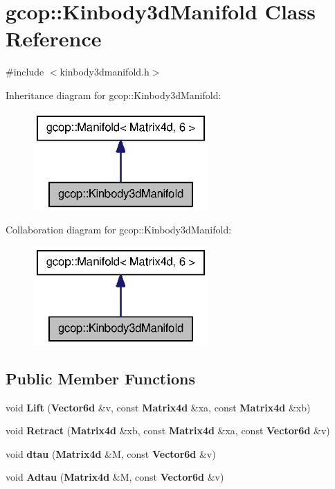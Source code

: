 \section{gcop\-:\-:\-Kinbody3d\-Manifold \-Class \-Reference}
\label{classgcop_1_1Kinbody3dManifold}


{\ttfamily \#include $<$kinbody3dmanifold.\-h$>$}



\-Inheritance diagram for gcop\-:\-:\-Kinbody3d\-Manifold\-:\nopagebreak
\begin{figure}[H]
\begin{center}
\leavevmode
\includegraphics[width=190pt]{classgcop_1_1Kinbody3dManifold__inherit__graph}
\end{center}
\end{figure}


\-Collaboration diagram for gcop\-:\-:\-Kinbody3d\-Manifold\-:\nopagebreak
\begin{figure}[H]
\begin{center}
\leavevmode
\includegraphics[width=190pt]{classgcop_1_1Kinbody3dManifold__coll__graph}
\end{center}
\end{figure}
\subsection*{\-Public \-Member \-Functions}
\begin{DoxyCompactItemize}
\item 
void {\bf \-Lift} ({\bf \-Vector6d} \&v, const {\bf \-Matrix4d} \&xa, const {\bf \-Matrix4d} \&xb)
\item 
void {\bf \-Retract} ({\bf \-Matrix4d} \&xb, const {\bf \-Matrix4d} \&xa, const {\bf \-Vector6d} \&v)
\item 
void {\bf dtau} ({\bf \-Matrix4d} \&\-M, const {\bf \-Vector6d} \&v)
\item 
void {\bf \-Adtau} ({\bf \-Matrix4d} \&\-M, const {\bf \-Vector6d} \&v)
\end{DoxyCompactItemize}
